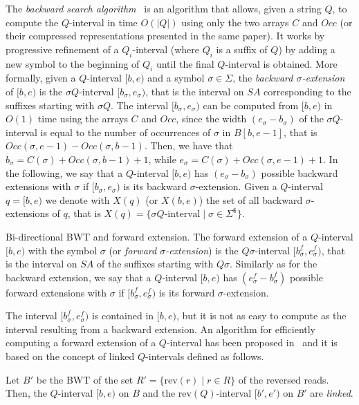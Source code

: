 \documentclass[runningheads,envcountsame,a4paper]{llncs}
\makeatletter
\newcommand{\paragrafo}{%
  \@startsection{paragraph}{4}{\z@ }{-7\p@ \@plus -4\p@ \@minus -4\p@
  }{-0.5em \@plus -0.22em \@minus -0.1em}{\normalfont \normalsize \itshape
  }
}
\newcommand{\rev}{\ensuremath{\mathrm{rev}}}
\newcommand{\SA}{\ensuremath{\textit{SA}}}
\newcommand{\Occ}{\ensuremath{\textit{Occ}}}
\makeatother
\begin{document}
The \emph{backward search algorithm}~\cite{Ferragina2005} is an
algorithm that allows, given a string $Q$, to compute the $Q$-interval
in time $O(|Q|)$ using only the two arrays $C$ and $\Occ$ (or their
compressed representations presented in the same paper).
It works by progressive refinement of a $Q_i$-interval (where $Q_i$ is a
suffix of $Q$) by adding a new symbol to the beginning of $Q_i$ until the
final $Q$-interval is obtained.
More formally, given a $Q$-interval $[b,e)$ and a symbol $\sigma \in
\Sigma$, the \emph{backward $\sigma$-extension} of $[b,e)$ is the
$\sigma Q$-interval $[b_{\sigma},e_{\sigma})$, that is the interval on
$\SA$ corresponding to the suffixes starting with $\sigma Q$.
The interval $[b_{\sigma}, e_{\sigma})$ can be computed from $[b,e)$ in
$O(1)$ time using the arrays $C$ and $\Occ$, since the width
$(e_{\sigma}-b_{\sigma})$ of the $\sigma Q$-interval is equal to the
number of occurrences of $\sigma$ in $B[b, e-1]$, that is
$\Occ(\sigma, e-1)-\Occ(\sigma, b-1)$.
Then, we have that $b_{\sigma} =C(\sigma) + \Occ(\sigma, b-1) + 1$,
while $e_{\sigma} =C(\sigma) + \Occ(\sigma, e-1) + 1$.
In the following, we say that a $Q$-interval $[b,e)$ has
$(e_{\sigma}-b_{\sigma})$ possible backward extensions with $\sigma$ if
$[b_{\sigma},e_{\sigma})$ is its backward $\sigma$-extension.
Given a $Q$-interval $q=[b,e)$ we denote with $X(q)$ (or $X(b,e)$)
the set of all backward $\sigma$-extensions of $q$, that is $X(q)=\{
\sigma Q\text{-interval} \mid \sigma\in\Sigma^\$\}$.

\paragrafo{Bi-directional BWT and forward extension.}
The forward extension of a $Q$-interval $[b,e)$ with the symbol
$\sigma$ (or \emph{forward $\sigma$-extension}) is the $Q
\sigma$-interval $[b^f_{\sigma},e^f_{\sigma})$, that is the interval on
$\SA$ of the suffixes starting with $Q \sigma$.
Similarly as for the backward extension, we say that a $Q$-interval
$[b,e)$ has $(e^f_{\sigma}-b^f_{\sigma})$ possible forward extensions
with $\sigma$ if $[b^f_{\sigma},e^f_{\sigma})$ is its forward
$\sigma$-extension.

The interval $[b^f_{\sigma},e^f_{\sigma})$ is contained in $[b,e)$, but
it is not as easy to compute as the interval resulting from a backward
extension.
An algorithm for efficiently computing a forward extension of a
$Q$-interval has been proposed in~\cite{Lam2009,Simpson2010} and it is
based on the concept of linked $Q$-intervals defined as follows.
\begin{definition}
Let $B'$ be the BWT of the set $R' = \{ \rev(r) \mid r \in R\}$ of the
reversed reads.
Then, the $Q$-interval $[b,e)$ on $B$ and the $\rev(Q)$-interval
$[b',e')$ on $B'$ are \emph{linked}.
\end{definition}
\end{document}
